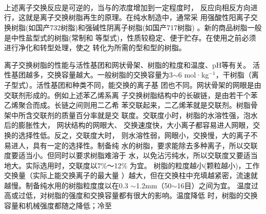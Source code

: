 {\centering
{}\\
\\
\\}

上述离子交换反应是可逆的，当与的浓度增加到一定程度时，
反应向相反方向进行，这就是离子交换树脂再生的原理。在纯水制造中，通常采
用强酸性阳离子交换树脂(如国产732树脂)和强碱性阴离子树脂(如国产717树脂)
。新的商品树脂一般是中性盐型式的树脂(常制和
等型式)，性质较稳定、便于贮存。在使用之前必须进行净化和转型处理，使之
转化为所需的型和型的树脂。

离子交换树脂的性能与活性基团和网状骨架、树脂的粒度和温度、pH等有关。
 活性基团越多，交换容量越大。一般树脂的交换容量为3$\sim$6 
mol·kg$^{-1}$，干树脂（离子型式）。活性基团和种类不同，能交换的离子基
团也不同。网状骨架的网眼是由交联剂形成的。例如上述苯乙烯系离
子交换树脂结构中的长碳链，是由若干个苯乙烯聚合而成。长链之间则用二乙希
苯交联起来，二乙烯苯就是交联剂。树脂骨架中所含交联剂的质量百分率就是交
联度。交联度小时，树脂的水溶性强，泡水后的膨胀性大， 网状结构的网眼大、
交换速度快，大小离子都容易进人网眼，交换的选择性低。反之，交联度大时，
则水溶性弱，网眼小，交换慢，大的离子不易进人，具有一定的选择性。制备纯
水的树脂，要求能除去多种离子，所以交联度要适当小。但同时以要求树脂难溶于
水，以免沾污纯水，所以交联度又要适当地大。实际选用时，交联度以7\%～12\%
为宜。
树脂的粒度越小(颗粒越小)，工作交换量（实际上能交换离子的最大量
）越大，但在交换柱中充填越紧密，流速就越慢。制备纯水用的树脂粒度度以在0.3
$\sim$1.2mm（50$\sim$16目）之间为宜。
温度过高或过低，对树脂的强度和交换容量都有很大的影响。温度降低
时，树脂的交换容量和机械强度都随之降低；冷至
